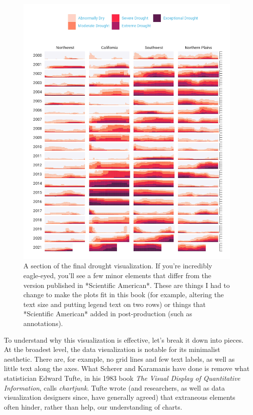 \documentclass[
]{book}
\begin{document}
\begin{figure}
\includegraphics[width=1\linewidth]{data-viz_files/figure-latex/final-viz-1} \caption{A section of the final drought visualization. If you’re incredibly eagle-eyed, you’ll see a few minor elements that differ from the version published in *Scientific American*. These are things I had to change to make the plots fit in this book (for example, altering the text size and putting legend text on two rows) or things that *Scientific American* added in post-production (such as annotations).}\label{fig:final-viz}
\end{figure}

To understand why this visualization is effective, let's break it down into pieces. At the broadest level, the data visualization is notable for its minimalist aesthetic. There are, for example, no grid lines and few text labels, as well as little text along the axes. What Scherer and Karamanis have done is remove what statistician Edward Tufte, in his 1983 book \emph{The Visual Display of Quantitative Information}, calls \emph{chartjunk}. Tufte wrote (and researchers, as well as data visualization designers since, have generally agreed) that extraneous elements often hinder, rather than help, our understanding of charts.
\end{document}
